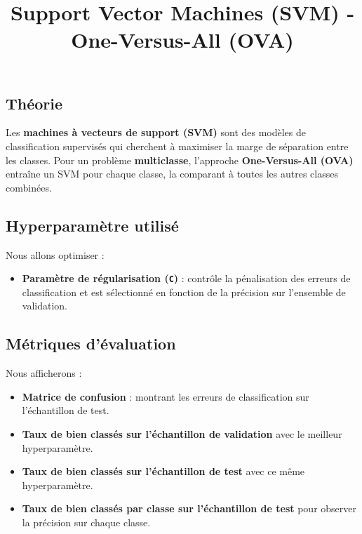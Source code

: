 \documentclass[
  letterpaper,
  DIV=11,
  numbers=noendperiod]{scrartcl}
\title{Support Vector Machines (SVM) - One-Versus-All (OVA)}
\author{}
\date{}
\providecommand{\tightlist}{%
  \setlength{\itemsep}{0pt}\setlength{\parskip}{0pt}}\usepackage{longtable,booktabs,array}
\begin{document}
\maketitle


\subsection{Théorie}\label{thuxe9orie}

Les \textbf{machines à vecteurs de support (SVM)} sont des modèles de
classification supervisés qui cherchent à maximiser la marge de
séparation entre les classes. Pour un problème \textbf{multiclasse},
l'approche \textbf{One-Versus-All (OVA)} entraîne un SVM pour chaque
classe, la comparant à toutes les autres classes combinées.

\subsection{Hyperparamètre utilisé}\label{hyperparamuxe8tre-utilisuxe9}

Nous allons optimiser :

\begin{itemize}
\tightlist
\item
  \textbf{Paramètre de régularisation (\texttt{C})} : contrôle la
  pénalisation des erreurs de classification et est sélectionné en
  fonction de la précision sur l'ensemble de validation.
\end{itemize}

\subsection{Métriques d'évaluation}\label{muxe9triques-duxe9valuation}

Nous afficherons :

\begin{itemize}
\item
  \textbf{Matrice de confusion} : montrant les erreurs de classification
  sur l'échantillon de test.
\item
  \textbf{Taux de bien classés sur l'échantillon de validation} avec le
  meilleur hyperparamètre.
\item
  \textbf{Taux de bien classés sur l'échantillon de test} avec ce même
  hyperparamètre.
\item
  \textbf{Taux de bien classés par classe sur l'échantillon de test}
  pour observer la précision sur chaque classe.
\end{itemize}
\end{document}
